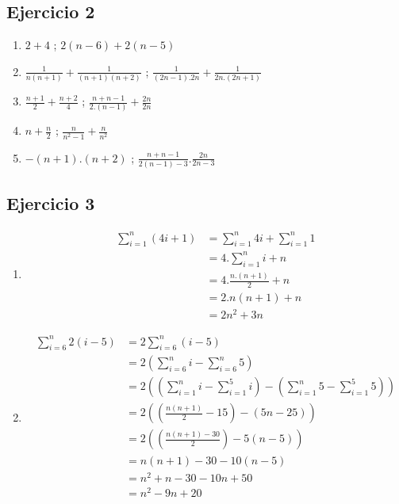 \subsection{Ejercicio 2}
\begin{enumerate}[label=(\alph*)]
    \item $2+4$ ; $2(n-6)+ 2(n-5)$
    \item $\frac{1}{n(n+1)} + \frac{1}{(n+1)(n+2)}$ ; $\frac{1}{(2n-1).2n} + \frac{1}{2n.(2n+1)}$
    \item $\frac{n+1}{2} + \frac{n+2}{4}$ ; $\frac{n+n-1}{2.(n-1)} + \frac{2n}{2n}$
    \item $n + \frac{n}{2}$ ; $\frac{n}{n^2-1} + \frac{n}{n^2}$
    \item $-(n+1) . (n+2)$ ; $\frac{n+n-1}{2(n-1)-3} . \frac{2n}{2n-3}$
\end{enumerate}

\subsection{Ejercicio 3}
\begin{enumerate}[label=(\alph*)]
    \item \begin{align*}
        \sum_{i=1}^{n}(4i+1) &= \sum_{i=1}^{n}4i + \sum_{i=1}^{n} 1 \\
        &= 4 . \sum_{i=1}^{n}i + n \\
        &= 4 . \frac{n.(n+1)}{2} + n \\
        &= 2 . n(n+1) + n \\
        &= 2n^2 + 3n
    \end{align*}
    \item \begin{align*}
        \sum_{i=6}^{n}2(i-5) &= 2\sum_{i=6}^{n}(i-5)\\
        &= 2\left( \sum_{i=6}^{n}i -\sum_{i=6}^{n}5 \right) \\
        &= 2\left( \left(\sum_{i=1}^{n}i - \sum_{i=1}^{5}i\right) -\left(\sum_{i=1}^{n}5 - \sum_{i=1}^{5}5\right) \right) \\
        &= 2\left( \left(\frac{n(n+1)}{2} - 15 \right) -\left(5n - 25 \right)\right) \\
        &= 2\left( \left(\frac{n(n+1) - 30}{2} \right) - 5(n-5)\right) \\
        &= n(n+1) - 30 - 10(n-5) \\ 
        &= n^2 + n - 30 - 10n+50 \\
        &= n^2 - 9n+20 \\
    \end{align*}
\end{enumerate}

